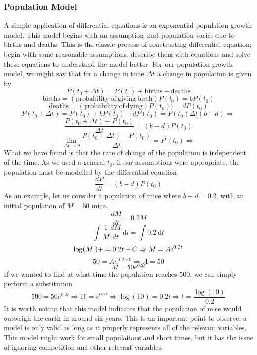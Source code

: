 \documentclass[12pt]{report}
\begin{document}
\begin{flushleft}
\subsubsection*{Population Model}
A simple application of differential equations is an exponential population
growth model. This model begins with an assumption that population varies due
to births and deaths. This is the classic process of constructing differential
equation; begin with some reasonable assumptions, describe them with equations
and solve these equations to understand the model better. For our population
growth model, we might say that for a change in time \(\Delta t\) a change in
population is given by
\[P(t_0 + \Delta t) = P(t_0) + \mathrm{births} - \mathrm{deaths}\]
\[\mathrm{births} = (\mathrm{probability\:of\:giving\:birth})P(t_0) = bP(t_0)\]
\[\mathrm{deaths} = (\mathrm{probability\:of\:dying})P(t_0)) = dP(t_0)\]
\[P(t_0 + \Delta t) = P(t_0) + bP(t_0) - dP(t_0) = P(t_0)\Delta t(b - d) 
\Rightarrow\]
\[\frac{P(t_0 + \Delta t) - P(t_0)}{\Delta t} = (b - d)P(t_0)\]
\[\lim_{\Delta t \rightarrow 0} \frac{P(t_0 + \Delta t) - P(t_0)}{\Delta t} 
= P^\prime(t_0) \Rightarrow\]
What we have found is that the rate of change of the population is independent
of the time. As we used a general \(t_0\), if our assumptions were appropriate,
the population must be modelled by the differential equation
\[\frac{dP}{dt} = (b - d)P(t_0)\]
As an example, let us consider a population of mice where \(b - d = 0.2\), with
an initial population of \(M = 50\) mice.
\[\frac{dM}{dt} = 0.2M\]
\[\int \frac{1}{M}\frac{dM}{dt} \:\mathrm{d}t = \int 0.2 \:\mathrm{d}t\]
\[\log(\abs{M}) + = 0.2t + C \Rightarrow M = Ae^{0.2t}\]
\[50 = Ae^{0.2 \times 0} \Rightarrow A = 50\]
\[M = 50e^{0.2t}\]
If we wanted to find at what time the population reaches \(500\), we can simply
perform a substitution.
\[500 = 50e^{0.2t} \Rightarrow 10 = e^{0.2t} \Rightarrow \log(10) = 0.2t 
\Rightarrow t = \frac{\log(10)}{0.2}\]
It is worth noting that this model indicates that the population of mice would
outweigh the earth in around six years. This is an important point to observe;
a model is only valid as long as it properly represents all of the relevant
variables. This model might work for small populations and short times, but it
has the issue of ignoring competition and other relevant variables. 


\end{flushleft}
\end{document}
